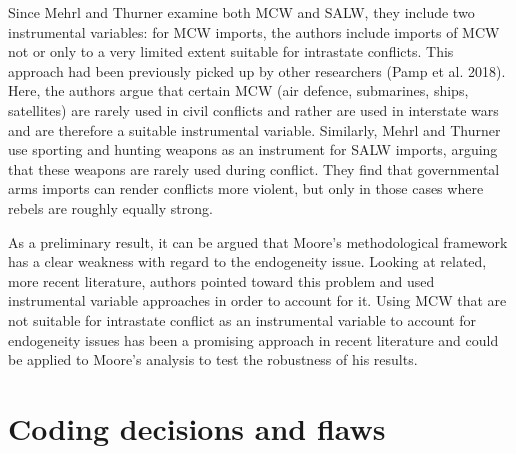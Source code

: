 \documentclass[
]{article}
\begin{document}
Since Mehrl and Thurner examine both MCW and SALW, they include two
instrumental variables: for MCW imports, the authors include imports of
MCW not or only to a very limited extent suitable for intrastate
conflicts. This approach had been previously picked up by other
researchers (Pamp et al. 2018). Here, the authors argue that certain MCW
(air defence, submarines, ships, satellites) are rarely used in civil
conflicts and rather are used in interstate wars and are therefore a
suitable instrumental variable. Similarly, Mehrl and Thurner use
sporting and hunting weapons as an instrument for SALW imports, arguing
that these weapons are rarely used during conflict. They find that
governmental arms imports can render conflicts more violent, but only in
those cases where rebels are roughly equally strong.

As a preliminary result, it can be argued that Moore's methodological
framework has a clear weakness with regard to the endogeneity issue.
Looking at related, more recent literature, authors pointed toward this
problem and used instrumental variable approaches in order to account
for it. Using MCW that are not suitable for intrastate conflict as an
instrumental variable to account for endogeneity issues has been a
promising approach in recent literature and could be applied to Moore's
analysis to test the robustness of his results.

\hypertarget{coding-decisions-and-flaws}{%
\section{Coding decisions and flaws}\label{coding-decisions-and-flaws}}
\end{document}

